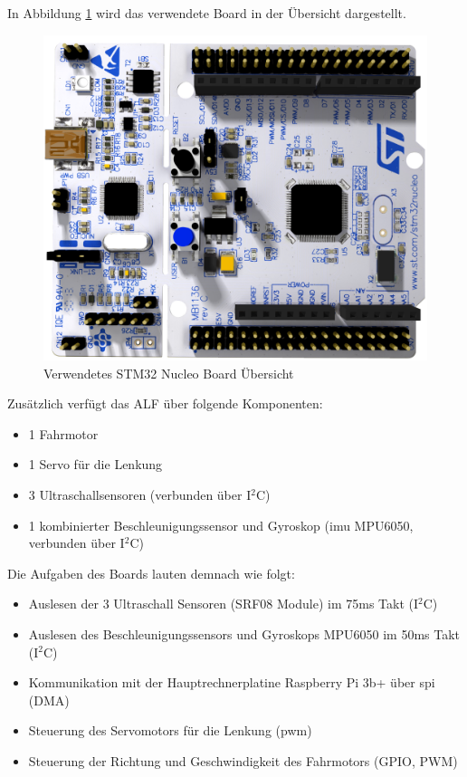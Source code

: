 In Abbildung \ref{pic:STM32NucleoBoardPicture} wird das verwendete Board in der Übersicht dargestellt.

\begin{figure}[hbtp]
\centering
\includegraphics[scale=0.4]{images/chapter4/STMNucleoBoardPicture.png}
\caption{Verwendetes STM32 Nucleo Board Übersicht}
\label{pic:STM32NucleoBoardPicture}
\end{figure}


Zusätzlich verfügt das ALF über folgende Komponenten:
\begin{itemize}
\item 1 Fahrmotor
\item 1 Servo für die Lenkung
\item 3 Ultraschallsensoren (verbunden über I$^{2}$C)
\item 1 kombinierter Beschleunigungssensor und Gyroskop (\acrfull{imu} MPU6050, verbunden über I$^{2}$C)
\end{itemize}

Die Aufgaben des Boards lauten demnach wie folgt:
\begin{itemize}
\item Auslesen der 3 Ultraschall Sensoren (SRF08 Module) im 75ms Takt (I$^{2}$C)
\item Auslesen des Beschleunigungssensors und Gyroskops MPU6050 im 50ms Takt (I$^{2}$C)
\item Kommunikation mit der Hauptrechnerplatine Raspberry Pi 3b+ über \acrfull{spi} (DMA)
\item Steuerung des Servomotors für die Lenkung (\acrfull{pwm})
\item Steuerung der Richtung und Geschwindigkeit des Fahrmotors (GPIO, PWM)
\end{itemize}


